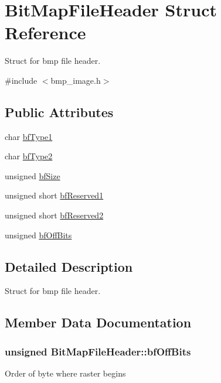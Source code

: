 \hypertarget{structBitMapFileHeader}{}\section{Bit\+Map\+File\+Header Struct Reference}
\label{structBitMapFileHeader}


Struct for bmp file header.  




{\ttfamily \#include $<$bmp\+\_\+image.\+h$>$}

\subsection*{Public Attributes}
\begin{DoxyCompactItemize}
\item 
char \hyperlink{structBitMapFileHeader_a9fec7cc3a304b3f557a6ab13f58b35ca}{bf\+Type1}
\item 
char \hyperlink{structBitMapFileHeader_a561a5c86bbc4f06973f803ee0b7b2f60}{bf\+Type2}
\item 
unsigned \hyperlink{structBitMapFileHeader_a18198264845f2443c8b6d972c4bd404f}{bf\+Size}
\item 
unsigned short \hyperlink{structBitMapFileHeader_a2c5cfaf1990593f4b9f980bcb528e82f}{bf\+Reserved1}
\item 
unsigned short \hyperlink{structBitMapFileHeader_aeaae0d627a62f9ca61be427dc3a99852}{bf\+Reserved2}
\item 
unsigned \hyperlink{structBitMapFileHeader_a8f9826fd212549a50718ffde5ccee43f}{bf\+Off\+Bits}
\end{DoxyCompactItemize}


\subsection{Detailed Description}
Struct for bmp file header. 

\subsection{Member Data Documentation}
\subsubsection[{\texorpdfstring{bf\+Off\+Bits}{bfOffBits}}]{\setlength{\rightskip}{0pt plus 5cm}unsigned Bit\+Map\+File\+Header\+::bf\+Off\+Bits}\hypertarget{structBitMapFileHeader_a8f9826fd212549a50718ffde5ccee43f}{}\label{structBitMapFileHeader_a8f9826fd212549a50718ffde5ccee43f}
Order of byte where raster begins 
